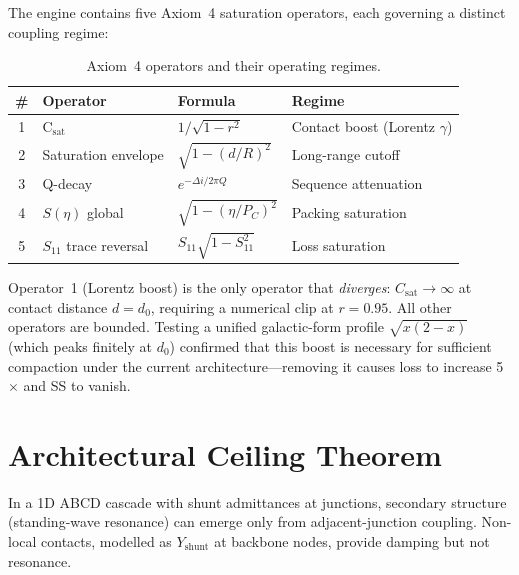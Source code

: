 The engine contains five Axiom~4 saturation operators, each governing a distinct coupling regime:

\begin{table}[H]
\centering
\caption{Axiom~4 operators and their operating regimes.}
\label{tab:saturation_operators}
\begin{tabular}{@{}c l l l@{}}
\toprule
\textbf{\#} & \textbf{Operator} & \textbf{Formula} & \textbf{Regime} \\
\midrule
1 & C$_\text{sat}$               & $1/\sqrt{1-r^2}$               & Contact boost (Lorentz $\gamma$) \\
2 & Saturation envelope           & $\sqrt{1-(d/R)^2}$             & Long-range cutoff \\
3 & Q-decay                       & $e^{-\Delta i / 2\pi Q}$       & Sequence attenuation \\
4 & $S(\eta)$ global              & $\sqrt{1-(\eta/P_C)^2}$        & Packing saturation \\
5 & $S_{11}$ trace reversal       & $S_{11}\sqrt{1-S_{11}^2}$      & Loss saturation \\
\bottomrule
\end{tabular}
\end{table}

\noindent Operator~1 (Lorentz boost) is the only operator that \emph{diverges}: $C_\text{sat} \to \infty$ at contact distance $d = d_0$, requiring a numerical clip at $r = 0.95$.  All other operators are bounded.  Testing a unified galactic-form profile $\sqrt{x(2-x)}$ (which peaks finitely at $d_0$) confirmed that this boost is necessary for sufficient compaction under the current architecture---removing it causes loss to increase 5$\times$ and SS to vanish.

\section{Architectural Ceiling Theorem}
\label{sec:architectural_ceiling}

\begin{theorem}
In a 1D ABCD cascade with shunt admittances at junctions, secondary structure (standing-wave resonance) can emerge only from adjacent-junction coupling.  Non-local contacts, modelled as $Y_\text{shunt}$ at backbone nodes, provide damping but not resonance.
\end{theorem}

